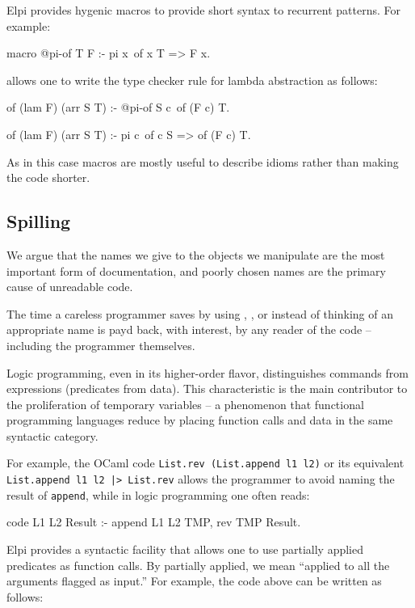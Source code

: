 \documentclass[a4paper, 11pt]{book}
\begin{document}
Elpi provides hygenic macros to provide short syntax to recurrent patterns.
For example:

\begin{elpicode}
macro @pi-of T F      :- pi x\ of x T => F x.
\end{elpicode}

\noindent allows one to write the type checker rule for lambda abstraction
as follows:

\begin{elpicode}
of (lam F) (arr S T) :- @pi-of S c\ of (F c) T.

of (lam F) (arr S T) :- pi c\ of c S => of (F c) T.
\end{elpicode}

\noindent
As in this case macros are mostly useful to describe idioms rather than
making the code shorter.


\subsection{Spilling}\label{sec:spilling}


We argue that the names we give to the objects we manipulate are the most
important form of documentation, and poorly chosen names are the primary cause
of unreadable code.

The time a careless programmer saves by using , , or
 instead of thinking of an appropriate name is payd back, with
interest, by any reader of the code -- including the programmer themselves.

Logic programming, even in its higher-order flavor, distinguishes commands
from expressions (predicates from data). This characteristic is the main
contributor to the proliferation of temporary variables -- a phenomenon that
functional programming languages reduce by placing function calls and data in
the same syntactic category.

For example, the OCaml code \texttt{List.rev (List.append l1 l2)} or its
equivalent \texttt{List.append l1 l2 |> List.rev} allows the programmer to
avoid naming the result of \texttt{append}, while in logic programming one
often reads:

\begin{elpicode}
code L1 L2 Result :- append L1 L2 TMP, rev TMP Result.
\end{elpicode}
Elpi provides a syntactic facility that allows one to use partially applied
predicates as function calls. By partially applied, we mean ``applied to all
the arguments flagged as input.'' For example, the code above can be written as
follows:
\end{document}
